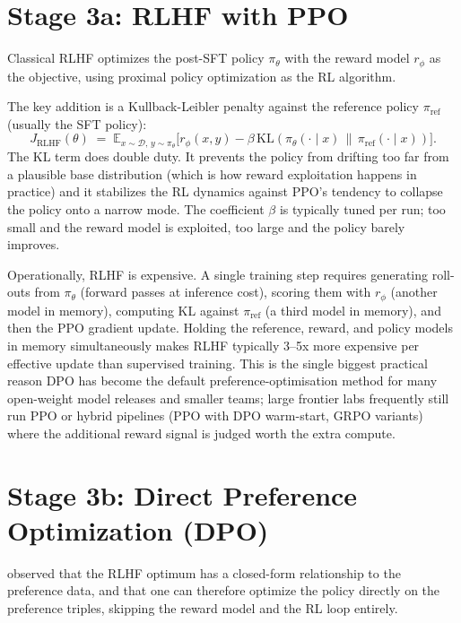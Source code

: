 \section{Stage 3a: RLHF with PPO}

Classical RLHF \citep{christiano2017deep, ouyang2022training}
optimizes the post-SFT policy $\pi_\theta$ with the reward model
$r_\phi$ as the objective, using proximal policy optimization
\citep{schulman2017ppo} as the RL algorithm.

The key addition is a Kullback-Leibler penalty against the
reference policy $\pi_\text{ref}$ (usually the SFT policy):
\begin{equation}
  J_\text{RLHF}(\theta)
  \;=\;
  \mathbb{E}_{x \sim \mathcal{D},\, y \sim \pi_\theta}
  \Big[
    r_\phi(x, y) - \beta\, \mathrm{KL}\!\left(\pi_\theta(\cdot \mid x)\,\|\, \pi_\text{ref}(\cdot \mid x)\right)
  \Big].
  \label{eq:rlhf}
\end{equation}
The KL term does double duty. It prevents the policy from drifting
too far from a plausible base distribution (which is how reward
exploitation happens in practice) and it stabilizes the RL dynamics
against PPO's tendency to collapse the policy onto a narrow mode.
The coefficient $\beta$ is typically tuned per run; too small and
the reward model is exploited, too large and the policy barely
improves.

Operationally, RLHF is expensive. A single training step requires
generating roll-outs from $\pi_\theta$ (forward passes at inference
cost), scoring them with $r_\phi$ (another model in memory),
computing KL against $\pi_\text{ref}$ (a third model in memory), and
then the PPO gradient update. Holding the reference, reward, and
policy models in memory simultaneously makes RLHF typically 3--5x
more expensive per effective update than supervised training. This
is the single biggest practical reason DPO has become the default
preference-optimisation method for many open-weight model releases
and smaller teams; large frontier labs frequently still run PPO or
hybrid pipelines (PPO with DPO warm-start, GRPO variants) where
the additional reward signal is judged worth the extra compute.

\section{Stage 3b: Direct Preference Optimization (DPO)}

\citet{rafailov2023direct} observed that the RLHF optimum has a
closed-form relationship to the preference data, and that one can
therefore optimize the policy directly on the preference triples,
skipping the reward model and the RL loop entirely.

